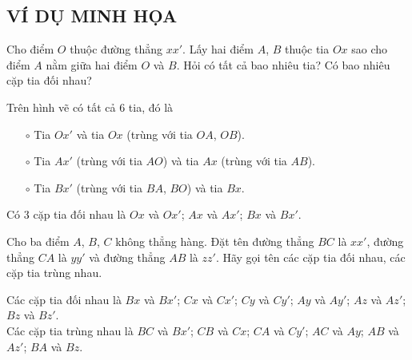 \subsection{VÍ DỤ MINH HỌA}

\begin{vd}%
	Cho điểm $O$ thuộc đường thẳng $xx'$. Lấy hai điểm $A$, $B$ thuộc tia $Ox$ sao cho điểm $A$ nằm giữa hai điểm $O$ và $B$. Hỏi có tất cả bao nhiêu tia? Có bao nhiêu cặp tia đối nhau?
	\loigiai
	{
		\begin{center}
		\end{center}
		Trên hình vẽ có tất cả $6$ tia, đó là
		\begin{itemize}
			\item[$\circ$] Tia $Ox'$ và tia $Ox$ (trùng với tia $OA$, $OB$).
			\item[$\circ$] Tia $Ax'$ (trùng với tia $AO$) và tia $Ax$ (trùng với tia $AB$).
			\item[$\circ$] Tia $Bx'$ (trùng với tia $BA$, $BO$) và tia $Bx$.
		\end{itemize}
		Có $3$ cặp tia đối nhau là $Ox$ và $Ox'$; $Ax$ và $Ax'$; $Bx$ và $Bx'$.
	}
\end{vd}

\begin{vd}%
	Cho ba điểm $A$, $B$, $C$ không thẳng hàng. Đặt tên đường thẳng $BC$ là $xx'$, đường thẳng $CA$ là $yy'$ và đường thẳng $AB$ là $zz'$. Hãy gọi tên các cặp tia đối nhau, các cặp tia trùng nhau.
	\loigiai
	{
		\immini
		{
			Các cặp tia đối nhau là $Bx$ và $Bx'$; $Cx$ và $Cx'$; $Cy$ và $Cy'$; $Ay$ và $Ay'$; $Az$ và $Az'$; $Bz$ và $Bz'$.\\
			Các cặp tia trùng nhau là $BC$ và $Bx'$; $CB$ và $Cx$; $CA$ và $Cy'$; $AC$ và $Ay$; $AB$ và $Az'$; $BA$ và $Bz$.
		}
		{
		}
	}
\end{vd}

